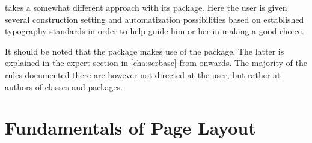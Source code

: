 \KOMAScript{} takes a somewhat different approach with its
 package. Here the user is given several
construction setting and automatization possibilities based on
established typography standards in order to help guide him or her in
making a good choice.

It should be noted that the  package makes use of
the  package. The latter is explained in the expert
section  in
\autoref{cha:scrbase} from  onwards. The
majority of the rules documented there are however not directed at the
user, but rather at authors of classes and packages. 


\section{Fundamentals of Page Layout}

